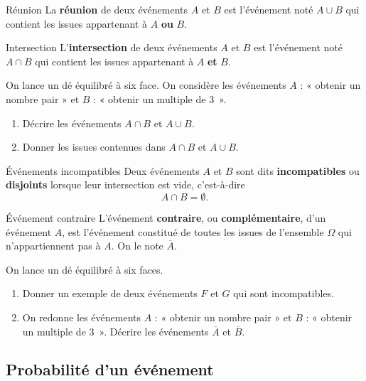 \documentclass[11pt]{article}
\begin{document}
\begin{defi}{Réunion}
  La \textbf{réunion} de deux événements $A$ et $B$ est l'événement noté $A\cup
  B$ qui contient les issues appartenant à $A$ \textbf{ou} $B$.
\end{defi}

\begin{defi}{Intersection}
  L'\textbf{intersection} de deux événements $A$ et $B$ est l'événement noté
  $A\cap B$ qui contient les issues appartenant à $A$ \textbf{et} $B$.
\end{defi}

\begin{app}
  On lance un dé équilibré à six face. On considère les événements $A$ : «
  obtenir un nombre pair » et $B$ : « obtenir un multiple de $3$~».
  \begin{enumerate}
    \item Décrire les événements $A\cap B$ et $A\cup B$.
    \item Donner les issues contenues dans $A\cap B$ et $A\cup B$.
  \end{enumerate}
\end{app}

\begin{defi}{Événements incompatibles}
  Deux événements $A$ et $B$ sont dits \textbf{incompatibles} ou
  \textbf{disjoints} lorsque leur intersection est vide, c'est-à-dire
  \[
    A\cap B = \emptyset.
  \]
\end{defi}

\begin{defi}{Événement contraire}
  L'événement \textbf{contraire}, ou \textbf{complémentaire}, d'un événement
  $A$, est l'événement constitué de toutes les issues de l'ensemble $\Omega$ qui
  n'appartiennent pas à $A$. On le note $\overline A$.
\end{defi}

\begin{app}
  On lance un dé équilibré à six faces.
  \begin{enumerate}
    \item Donner un exemple de deux événements $F$ et $G$ qui sont
      incompatibles.
    \item On redonne les événements $A$ : « obtenir un nombre pair » et $B$ : «
      obtenir un multiple de $3$~». Décrire les événements $\overline A$ et
      $\overline B$.
  \end{enumerate}
\end{app}

\subsection{Probabilité d'un événement}
\end{document}
